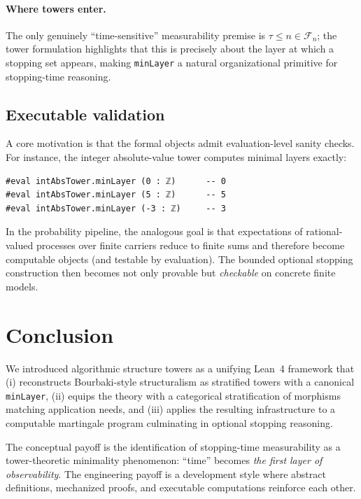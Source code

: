 \documentclass[11pt]{article}
\begin{document}
\paragraph{Where towers enter.}
The only genuinely ``time-sensitive'' measurability premise is ${\tau\le n}\in\mathcal F_n$; the tower formulation highlights that this is precisely about the layer at which a stopping set appears, making \texttt{minLayer} a natural organizational primitive for stopping-time reasoning. %

\subsection{Executable validation}

A core motivation is that the formal objects admit evaluation-level sanity checks. For instance, the integer absolute-value tower computes minimal layers exactly:

\begin{lstlisting}[language={},caption={Lean: evaluation-level checks (example)}]
#eval intAbsTower.minLayer (0 : ℤ)      -- 0
#eval intAbsTower.minLayer (5 : ℤ)      -- 5
#eval intAbsTower.minLayer (-3 : ℤ)     -- 3
\end{lstlisting}

In the probability pipeline, the analogous goal is that expectations of rational-valued processes over finite carriers reduce to finite sums and therefore become computable objects (and testable by evaluation). The bounded optional stopping construction then becomes not only provable but \emph{checkable} on concrete finite models.

\section{Conclusion}

We introduced algorithmic structure towers as a unifying Lean~4 framework that (i) reconstructs Bourbaki-style structuralism as stratified towers with a canonical \texttt{minLayer}, (ii) equips the theory with a categorical stratification of morphisms matching application needs, and (iii) applies the resulting infrastructure to a computable martingale program culminating in optional stopping reasoning.

The conceptual payoff is the identification of stopping-time measurability as a tower-theoretic minimality phenomenon: ``time'' becomes \emph{the first layer of observability}. The engineering payoff is a development style where abstract definitions, mechanized proofs, and executable computations reinforce each other.
\end{document}
